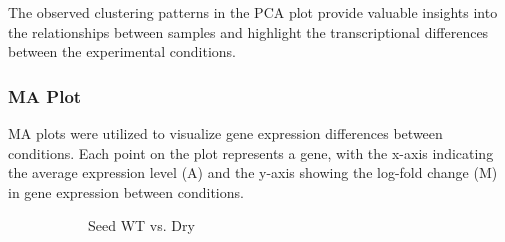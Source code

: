 \documentclass[12pt,letterpaper]{article}
\begin{document}
The observed clustering patterns in the PCA plot provide valuable insights into the relationships between samples and highlight the transcriptional differences between the experimental conditions.

\subsubsection{MA Plot}
MA plots were utilized to visualize gene expression differences between conditions. Each point on the plot represents a gene, with the x-axis indicating the average expression level (A) and the y-axis showing the log-fold change (M) in gene expression between conditions.

\begin{figure}[H]
\centering
\begin{subfigure}[b]{0.32\textwidth}
    \centering
    \caption{Seed WT vs. Dry}
    \label{fig:enter-label}
\end{subfigure}
\begin{subfigure}[b]{0.32\textwidth}
    \centering

\end{subfigure}
\end{figure}
\end{document}
